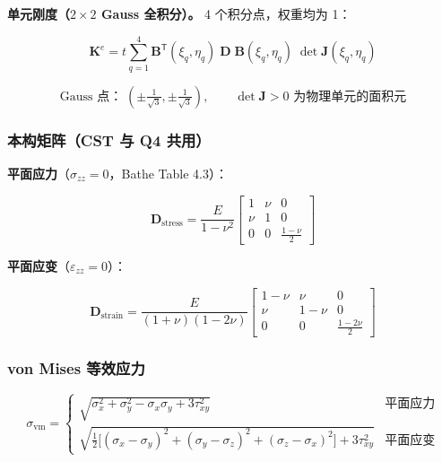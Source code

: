 \documentclass[12pt,a4paper]{ctexart}
\begin{document}
\textbf{单元刚度（$2\times2$ Gauss 全积分）。} 4 个积分点，权重均为 1：

\begin{equation}\label{eq:q4-K}
\mathbf{K}^e = t\sum_{q=1}^4 \mathbf{B}^{\mathsf T}(\xi_q,\eta_q)\;
\mathbf{D}\;\mathbf{B}(\xi_q,\eta_q)\;\det\mathbf{J}(\xi_q,\eta_q)
\end{equation}

\begin{equation}\label{eq:q4-gauss}
\text{Gauss 点：}\; (\pm\tfrac{1}{\sqrt{3}},\pm\tfrac{1}{\sqrt{3}}),\qquad
\det\mathbf{J} > 0 \text{ 为物理单元的面积元}
\end{equation}

\subsubsection{本构矩阵（CST 与 Q4 共用）}

\textbf{平面应力}（$\sigma_{zz}=0$，Bathe Table 4.3）：

\begin{equation}\label{eq:D-stress}
\mathbf{D}_{\text{stress}} = \frac{E}{1-\nu^2}
\begin{bmatrix}
1 & \nu & 0 \\
\nu & 1 & 0 \\
0 & 0 & \frac{1-\nu}{2}
\end{bmatrix}
\end{equation}

\textbf{平面应变}（$\varepsilon_{zz}=0$）：

\begin{equation}\label{eq:D-strain}
\mathbf{D}_{\text{strain}} = \frac{E}{(1+\nu)(1-2\nu)}
\begin{bmatrix}
1-\nu & \nu & 0 \\
\nu & 1-\nu & 0 \\
0 & 0 & \frac{1-2\nu}{2}
\end{bmatrix}
\end{equation}

\subsubsection{von Mises 等效应力}

\begin{equation}\label{eq:vm}
\sigma_{\text{vm}} = \begin{cases}
\sqrt{\sigma_x^2 + \sigma_y^2 - \sigma_x\sigma_y + 3\tau_{xy}^2} & \text{平面应力} \\[6pt]
\sqrt{\frac{1}{2}\big[(\sigma_x-\sigma_y)^2 + (\sigma_y-\sigma_z)^2 + (\sigma_z-\sigma_x)^2\big] + 3\tau_{xy}^2} & \text{平面应变}
\end{cases}
\end{equation}
\end{document}
